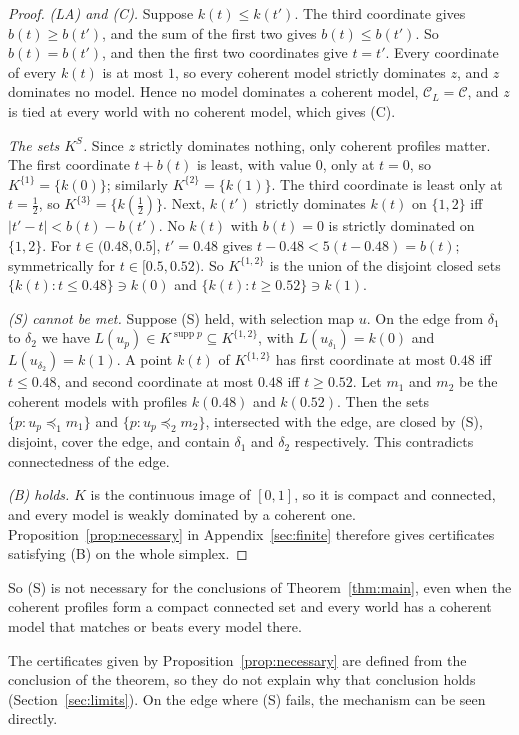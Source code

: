 \documentclass[11pt]{article}
\theoremstyle{definition}
\theoremstyle{remark}
\newcommand{\C}{\mathcal C}
\newcommand{\supp}{\operatorname{supp}}
\begin{document}
\begin{proof}
\emph{(LA) and (C).} Suppose $k(t)\le k(t')$. The third coordinate gives $b(t)\ge b(t')$, and the sum of the first two gives $b(t)\le b(t')$. So $b(t)=b(t')$, and then the first two coordinates give $t=t'$. Every coordinate of every $k(t)$ is at most $1$, so every coherent model strictly dominates $z$, and $z$ dominates no model. Hence no model dominates a coherent model, $\C_L=\C$, and $z$ is tied at every world with no coherent model, which gives (C).

\emph{The sets $K^S$.} Since $z$ strictly dominates nothing, only coherent profiles matter. The first coordinate $t+b(t)$ is least, with value $0$, only at $t=0$, so $K^{\{1\}}=\{k(0)\}$; similarly $K^{\{2\}}=\{k(1)\}$. The third coordinate is least only at $t=\tfrac12$, so $K^{\{3\}}=\{k(\tfrac12)\}$. Next, $k(t')$ strictly dominates $k(t)$ on $\{1,2\}$ iff $|t'-t|<b(t)-b(t')$. No $k(t)$ with $b(t)=0$ is strictly dominated on $\{1,2\}$. For $t\in(0.48,0.5]$, $t'=0.48$ gives $t-0.48<5(t-0.48)=b(t)$; symmetrically for $t\in[0.5,0.52)$. So $K^{\{1,2\}}$ is the union of the disjoint closed sets $\{k(t):t\le0.48\}\ni k(0)$ and $\{k(t):t\ge0.52\}\ni k(1)$.

\emph{(S) cannot be met.} Suppose (S) held, with selection map $u$. On the edge from $\delta_1$ to $\delta_2$ we have $L(u_p)\in K^{\supp p}\subseteq K^{\{1,2\}}$, with $L(u_{\delta_1})=k(0)$ and $L(u_{\delta_2})=k(1)$. A point $k(t)$ of $K^{\{1,2\}}$ has first coordinate at most $0.48$ iff $t\le0.48$, and second coordinate at most $0.48$ iff $t\ge0.52$. Let $m_1$ and $m_2$ be the coherent models with profiles $k(0.48)$ and $k(0.52)$. Then the sets $\{p:u_p\preceq_1 m_1\}$ and $\{p:u_p\preceq_2m_2\}$, intersected with the edge, are closed by (S), disjoint, cover the edge, and contain $\delta_1$ and $\delta_2$ respectively. This contradicts connectedness of the edge.

\emph{(B) holds.} $K$ is the continuous image of $[0,1]$, so it is compact and connected, and every model is weakly dominated by a coherent one. Proposition~\ref{prop:necessary} in Appendix~\ref{sec:finite} therefore gives certificates satisfying (B) on the whole simplex.
\end{proof}
So (S) is not necessary for the conclusions of Theorem~\ref{thm:main}, even when the coherent profiles form a compact connected set and every world has a coherent model that matches or beats every model there.

The certificates given by Proposition~\ref{prop:necessary} are defined from the conclusion of the theorem, so they do not explain why that conclusion holds (Section~\ref{sec:limits}). On the edge where (S) fails, the mechanism can be seen directly.
\end{document}
